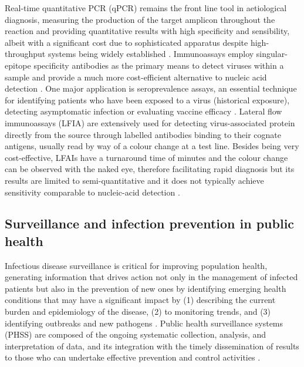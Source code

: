 Real-time quantitative PCR (qPCR) remains the front line tool in aetiological diagnosis, measuring the production of the target amplicon throughout the reaction and providing quantitative results with high specificity and sensibility, albeit with a significant cost due to sophisticated apparatus despite high-throughput systems being widely established \citep{cassedy_virus_2021}. Immunoassays employ singular-epitope specificity antibodies as the primary means to detect viruses within a sample and provide a much more cost-efficient alternative to nucleic acid detection \citep{cassedy_virus_2021}. One major application is seroprevalence assays, an essential technique for identifying patients who have been exposed to a virus (historical exposure), detecting asymptomatic infection or evaluating vaccine efficacy  \citep{chan_determining_2021, bobrovitz_global_2021}. Lateral flow immunoassays (LFIA) are extensively used for detecting virus-associated protein directly from the source through labelled antibodies binding to their cognate antigens, usually read by way of a colour change at a test line. Besides being very cost-effective, LFAIs have a turnaround time of minutes and the colour change can be observed with the naked eye, therefore facilitating rapid diagnosis but its results are limited to semi-quantitative and it does not typically achieve sensitivity comparable to nucleic-acid detection \citep{estrela_lateral_2016, cassedy_virus_2021, di_nardo_ten_2021}.

\subsection{Surveillance and infection prevention in public health} \label{ssec:survaillance}

Infectious disease surveillance is critical for improving population health, generating information that drives action not only in the management of infected patients but also in the prevention of new ones by identifying emerging health conditions that may have a significant impact by (1) describing the current burden and epidemiology of the disease, (2) to monitoring trends, and (3) identifying outbreaks and new pathogens \citep{groseclose_public_2017, murray_infectious_2017}. Public health surveillance systems (PHSS) are composed of the ongoing systematic collection, analysis, and interpretation of data, and its integration with the timely dissemination of results to those who can undertake effective prevention and control activities \citep{teutsch_considerations_2010}. 

